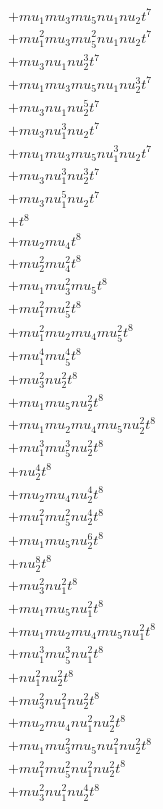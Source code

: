 \begin{align*}
  + mu_1 mu_3 mu_5 nu_1 nu_2 t^{7} \\
  + mu_1^{2} mu_3 mu_5^{2} nu_1 nu_2 t^{7} \\
  + mu_3 nu_1 nu_2^{3} t^{7} \\
  + mu_1 mu_3 mu_5 nu_1 nu_2^{3} t^{7} \\
  + mu_3 nu_1 nu_2^{5} t^{7} \\
  + mu_3 nu_1^{3} nu_2 t^{7} \\
  + mu_1 mu_3 mu_5 nu_1^{3} nu_2 t^{7} \\
  + mu_3 nu_1^{3} nu_2^{3} t^{7} \\
  + mu_3 nu_1^{5} nu_2 t^{7} \\
  + t^{8} \\
  + mu_2 mu_4 t^{8} \\
  + mu_2^{2} mu_4^{2} t^{8} \\
  + mu_1 mu_3^{2} mu_5 t^{8} \\
  + mu_1^{2} mu_5^{2} t^{8} \\
  + mu_1^{2} mu_2 mu_4 mu_5^{2} t^{8} \\
  + mu_1^{4} mu_5^{4} t^{8} \\
  + mu_3^{2} nu_2^{2} t^{8} \\
  + mu_1 mu_5 nu_2^{2} t^{8} \\
  + mu_1 mu_2 mu_4 mu_5 nu_2^{2} t^{8} \\
  + mu_1^{3} mu_5^{3} nu_2^{2} t^{8} \\
  + nu_2^{4} t^{8} \\
  + mu_2 mu_4 nu_2^{4} t^{8} \\
  + mu_1^{2} mu_5^{2} nu_2^{4} t^{8} \\
  + mu_1 mu_5 nu_2^{6} t^{8} \\
  + nu_2^{8} t^{8} \\
  + mu_3^{2} nu_1^{2} t^{8} \\
  + mu_1 mu_5 nu_1^{2} t^{8} \\
  + mu_1 mu_2 mu_4 mu_5 nu_1^{2} t^{8} \\
  + mu_1^{3} mu_5^{3} nu_1^{2} t^{8} \\
  + nu_1^{2} nu_2^{2} t^{8} \\
  + mu_3^{2} nu_1^{2} nu_2^{2} t^{8} \\
  + mu_2 mu_4 nu_1^{2} nu_2^{2} t^{8} \\
  + mu_1 mu_3^{2} mu_5 nu_1^{2} nu_2^{2} t^{8} \\
  + mu_1^{2} mu_5^{2} nu_1^{2} nu_2^{2} t^{8} \\
  + mu_3^{2} nu_1^{2} nu_2^{4} t^{8} \\

\end{align*}
